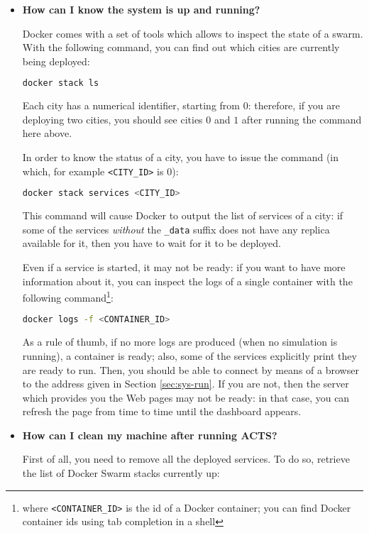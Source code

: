 \begin{itemize}
\item \textbf{How can I know the system is up and running?}

Docker comes with a set of tools which allows to inspect the state of a swarm.
With the following command, you can find out which cities are currently being
deployed:

\begin{lstlisting}[language=bash]
docker stack ls
\end{lstlisting}

Each city has a numerical identifier, starting from $0$: therefore, if you are
deploying two cities, you should see cities $0$ and $1$ after running the
command here above.

In order to know the status of a city, you have to issue the command (in which,
for example \texttt{<CITY\_ID>} is $0$):

\begin{lstlisting}[language=bash]
docker stack services <CITY_ID>
\end{lstlisting}

This command will cause Docker to output the list of services of a city: if
some of the services \emph{without} the \texttt{\_data} suffix does not have
any replica available for it, then you have to wait for it to be deployed.

Even if a service is started, it may not be ready: if you want to have more
information about it, you can inspect the logs of a single container with the
following command\footnote{where \texttt{<CONTAINER\_ID>} is the id of a Docker
container; you can find Docker container ids using tab completion in a shell}:

\begin{lstlisting}[language=bash]
docker logs -f <CONTAINER_ID>
\end{lstlisting}

As a rule of thumb, if no more logs are produced (when no simulation is
running), a container is ready; also, some of the services explicitly print
they are ready to run.
Then, you should be able to connect by means of a browser to the address given
in Section \ref{sec:sys-run}.
If you are not, then the server which provides you the Web pages may not be
ready: in that case, you can refresh the page from time to time until the
dashboard appears.

\item \textbf{How can I clean my machine after running ACTS?}

First of all, you need to remove all the deployed services.
To do so, retrieve the list of Docker Swarm stacks currently up:


\end{itemize}
